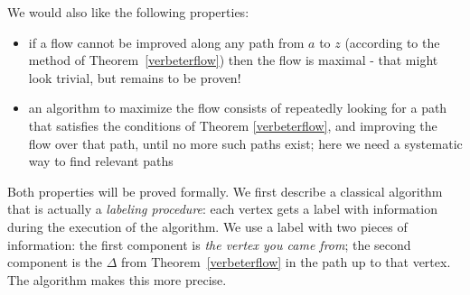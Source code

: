 We would also like the following properties:

\begin{itemize}
\item
if a flow cannot be improved along any path from $a$ to $z$ (according
to the method of Theorem~\ref{verbeterflow}) then the flow is maximal
- that might look trivial, but remains to be proven!
\item
an algorithm to maximize the flow consists of repeatedly looking for a
path that satisfies the conditions of Theorem \ref{verbeterflow},
and improving the flow over that path, until no more such paths exist;
here we need a systematic way to find relevant paths
\end{itemize}

Both properties will be proved formally. We first describe a classical
algorithm that is actually a {\em labeling procedure}: each vertex
gets a label with information during the execution of the algorithm.
We use a label with two pieces of information: the first component is
{\em the vertex you came from}; the second component is the $\Delta$
from Theorem~\ref{verbeterflow} in the path up to that vertex. The
algorithm makes this more precise.

